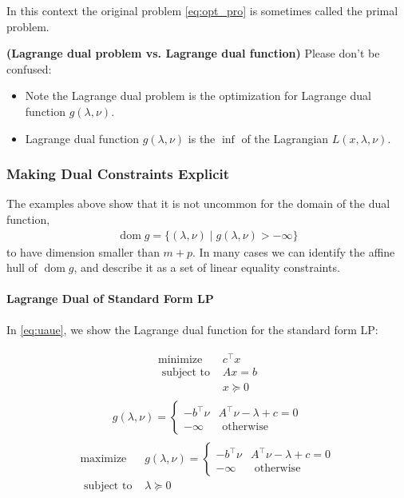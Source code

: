 \documentclass{article}
\newcommand{\bfs}[1]{\textbf{({#1}) }}
\begin{document}

In this context the original problem \cref{eq:opt_pro} is sometimes called the primal problem. 
\begin{rema}\bfs{Lagrange dual problem vs. Lagrange dual function}Please don't be confused:
\begin{itemize}
    \item Note the Lagrange dual problem is the optimization for Lagrange dual function $g(\lambda, \nu)$.
    \item Lagrange dual function $g(\lambda, \nu)$ is the $\inf$ of the Lagrangian $L(x, \lambda, \nu)$.
\end{itemize}

\end{rema}
\subsubsection{Making Dual Constraints Explicit}
The examples above show that it is not uncommon for the domain of the dual function,
\begin{align*}
\operatorname{dom} g=\{(\lambda, \nu) \mid g(\lambda, \nu)>-\infty\}
\end{align*}
to have dimension smaller than $m+p$. In many cases we can identify the affine hull of $\operatorname{dom} g$, and describe it as a set of linear equality constraints.
\paragraph{Lagrange Dual of Standard Form LP}
In \cref{eq:uaue}, we show the {Lagrange dual function} for the standard form LP:

\begin{align}
\begin{array}{ll}
\operatorname{minimize} & c^{\top} x \\
\text { subject to } & A x=b \\
& x \succeq 0
\end{array}\label{eq:grava}
\end{align}
\begin{align*}
g(\lambda, \nu)= \begin{cases}-b^{\top} \nu & A^{\top} \nu-\lambda+c=0 \\ -\infty & \text { otherwise }\end{cases}
\end{align*}
\begin{align}
\begin{array}{ll}
\operatorname{maximize} & g(\lambda, \nu)= \begin{cases}-b^{\top} \nu & A^{\top} \nu-\lambda+c=0 \\
-\infty & \text { otherwise }\end{cases} \\
\text { subject to } & \lambda \succeq 0
\end{array}\label{eq:gieda}
\end{align}
\end{document}
